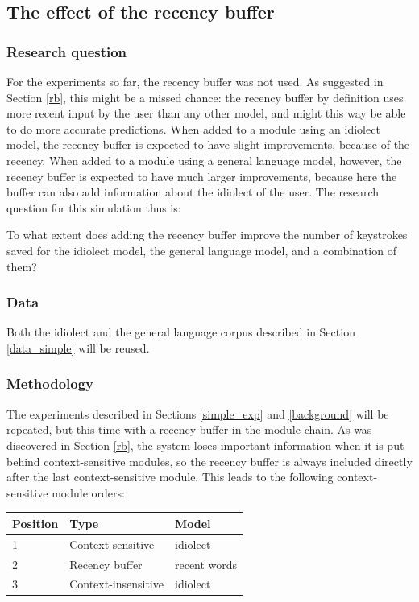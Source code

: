 \documentclass[11pt]{article}
\let\originaltable\table
\let\endoriginaltable\endtable
\renewenvironment{table}[1][ht]{%
  \originaltable[#1]
  \centering}%
  {\endoriginaltable}
\begin{document}
\subsection{The effect of the recency buffer} \label{recbuf}

\subsubsection{Research question}

For the experiments so far, the recency buffer was not used. As suggested in Section \ref{rb}, this might be a missed chance: the recency buffer by definition uses more recent input by the user than any other model, and might this way be able to do more accurate predictions. When added to a module using an idiolect model, the recency buffer is expected to have slight improvements, because of the recency. When added to a module using a general language model, however, the recency buffer is expected to have much larger improvements, because here the buffer can also add information about the idiolect of the user. The research question for this simulation thus is:

\begin{examples}
\item To what extent does adding the recency buffer improve the number of keystrokes saved for the idiolect model, the general language model, and a combination of them?
\end{examples}

\subsubsection{Data}

Both the idiolect and the general language corpus described in Section \ref{data_simple} will be reused. 

\subsubsection{Methodology}
The experiments described in Sections \ref{simple_exp} and \ref{background} will be repeated, but this time with a recency buffer in the module chain. As was discovered in Section \ref{rb}, the system loses important information when it is put behind context-sensitive modules, so the recency buffer is always included directly after the last context-sensitive module. This leads to the following context-sensitive module orders:

\begin{table}[H]
\begin{tabular}{lll} 
Position&Type&Model\\
\hline
1&Context-sensitive&idiolect\\
2&Recency buffer&recent words\\
3&Context-insensitive&idiolect\\
\end{tabular} 
\caption{The module order for simulation 1, with the idiolect model and the recency buffer} 
\end{table}
\end{document}
